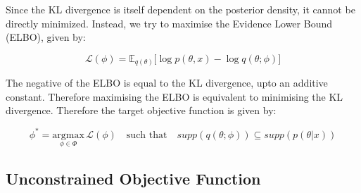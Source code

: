 \documentclass[10pt]{article}
\begin{document}
Since the KL divergence is itself dependent on the posterior density, it cannot be directly minimized. Instead, we try 
to maximise the Evidence Lower Bound (ELBO), given by:

\begin{equation*}
  \mathcal{L}(\phi) = \mathbb{E}_{q(\theta)}\big[\log p(\theta, x) - \log q(\theta;\phi) \big]
\end{equation*}

The negative of the ELBO is equal to the KL divergence, upto an additive constant. Therefore maximising the ELBO is 
equivalent to minimising the KL divergence. Therefore the target objective function is given by:

\begin{equation*}
  \phi^* = \underset{\phi \in \Phi}{\text{argmax}}\, \mathcal{L}(\phi) \quad \text{such that} \quad supp(q(\theta ; \phi)) \subseteq supp(p(\theta | x))
\end{equation*}

\subsection*{Unconstrained Objective Function}
\end{document}
